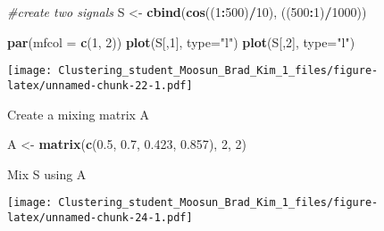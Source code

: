 \documentclass[11pt,]{article}
\newenvironment{Shaded}{\begin{snugshade}}{\end{snugshade}}
\newcommand{\CommentTok}[1]{\textcolor[rgb]{0.56,0.35,0.01}{\textit{#1}}}
\newcommand{\DataTypeTok}[1]{\textcolor[rgb]{0.13,0.29,0.53}{#1}}
\newcommand{\DecValTok}[1]{\textcolor[rgb]{0.00,0.00,0.81}{#1}}
\newcommand{\FloatTok}[1]{\textcolor[rgb]{0.00,0.00,0.81}{#1}}
\newcommand{\KeywordTok}[1]{\textcolor[rgb]{0.13,0.29,0.53}{\textbf{#1}}}
\newcommand{\NormalTok}[1]{#1}
\newcommand{\OperatorTok}[1]{\textcolor[rgb]{0.81,0.36,0.00}{\textbf{#1}}}
\newcommand{\StringTok}[1]{\textcolor[rgb]{0.31,0.60,0.02}{#1}}
\begin{document}
\begin{Shaded}
\begin{Highlighting}[]
\CommentTok{#create two signals}
\NormalTok{S <-}\StringTok{ }\KeywordTok{cbind}\NormalTok{(}\KeywordTok{cos}\NormalTok{((}\DecValTok{1}\OperatorTok{:}\DecValTok{500}\NormalTok{)}\OperatorTok{/}\DecValTok{10}\NormalTok{), ((}\DecValTok{500}\OperatorTok{:}\DecValTok{1}\NormalTok{)}\OperatorTok{/}\DecValTok{1000}\NormalTok{))}

\KeywordTok{par}\NormalTok{(}\DataTypeTok{mfcol =} \KeywordTok{c}\NormalTok{(}\DecValTok{1}\NormalTok{, }\DecValTok{2}\NormalTok{))}
\KeywordTok{plot}\NormalTok{(S[,}\DecValTok{1}\NormalTok{], }\DataTypeTok{type=}\StringTok{"l"}\NormalTok{)}
\KeywordTok{plot}\NormalTok{(S[,}\DecValTok{2}\NormalTok{], }\DataTypeTok{type=}\StringTok{"l"}\NormalTok{)}
\end{Highlighting}
\end{Shaded}

\texttt{[image: Clustering\_student\_Moosun\_Brad\_Kim\_1\_files/figure-latex/unnamed-chunk-22-1.pdf]}

Create a mixing matrix A

\begin{Shaded}
\begin{Highlighting}[]
\NormalTok{A <-}\StringTok{ }\KeywordTok{matrix}\NormalTok{(}\KeywordTok{c}\NormalTok{(}\FloatTok{0.5}\NormalTok{, }\FloatTok{0.7}\NormalTok{, }\FloatTok{0.423}\NormalTok{, }\FloatTok{0.857}\NormalTok{), }\DecValTok{2}\NormalTok{, }\DecValTok{2}\NormalTok{)}
\end{Highlighting}
\end{Shaded}

Mix S using A

\begin{Shaded}
\end{Shaded}

\texttt{[image: Clustering\_student\_Moosun\_Brad\_Kim\_1\_files/figure-latex/unnamed-chunk-24-1.pdf]}
\end{document}
